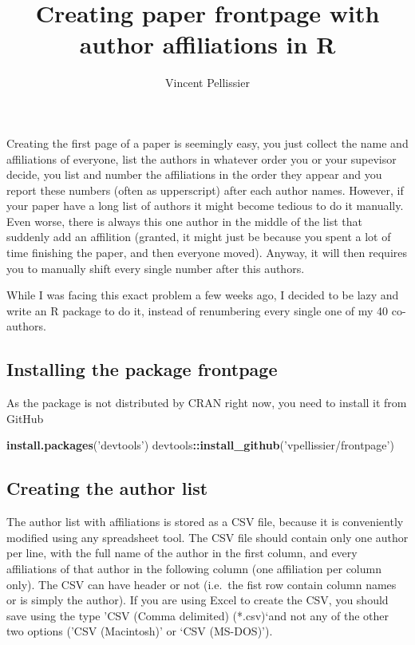 \documentclass[]{article}
\title{Creating paper frontpage with author affiliations in R}
\author{Vincent Pellissier}
\date{}
\newenvironment{Shaded}{\begin{snugshade}}{\end{snugshade}}
\newcommand{\KeywordTok}[1]{\textcolor[rgb]{0.13,0.29,0.53}{\textbf{#1}}}
\newcommand{\StringTok}[1]{\textcolor[rgb]{0.31,0.60,0.02}{#1}}
\newcommand{\OperatorTok}[1]{\textcolor[rgb]{0.81,0.36,0.00}{\textbf{#1}}}
\newcommand{\NormalTok}[1]{#1}
\begin{document}
\maketitle

Creating the first page of a paper is seemingly easy, you just collect
the name and affiliations of everyone, list the authors in whatever
order you or your supevisor decide, you list and number the affiliations
in the order they appear and you report these numbers (often as
upperscript) after each author names. However, if your paper have a long
list of authors it might become tedious to do it manually. Even worse,
there is always this one author in the middle of the list that suddenly
add an affilition (granted, it might just be because you spent a lot of
time finishing the paper, and then everyone moved). Anyway, it will then
requires you to manually shift every single number after this authors.

While I was facing this exact problem a few weeks ago, I decided to be
lazy and write an R package to do it, instead of renumbering every
single one of my 40 co-authors.

\subsection{Installing the package
frontpage}\label{installing-the-package-frontpage}

As the package is not distributed by CRAN right now, you need to install
it from GitHub

\begin{Shaded}
\begin{Highlighting}[]
\KeywordTok{install.packages}\NormalTok{(}\StringTok{'devtools'}\NormalTok{)}
\NormalTok{devtools}\OperatorTok{::}\KeywordTok{install_github}\NormalTok{(}\StringTok{'vpellissier/frontpage'}\NormalTok{)}
\end{Highlighting}
\end{Shaded}

\subsection{Creating the author list}\label{creating-the-author-list}

The author list with affiliations is stored as a CSV file, because it is
conveniently modified using any spreadsheet tool. The CSV file should
contain only one author per line, with the full name of the author in
the first column, and every affiliations of that author in the following
column (one affiliation per column only). The CSV can have header or not
(i.e.~the fist row contain column names or is simply the author). If you
are using Excel to create the CSV, you should save using the type 'CSV
(Comma delimited) (*.csv)`and not any of the other two options ('CSV
(Macintosh)' or `CSV (MS-DOS)').
\end{document}
